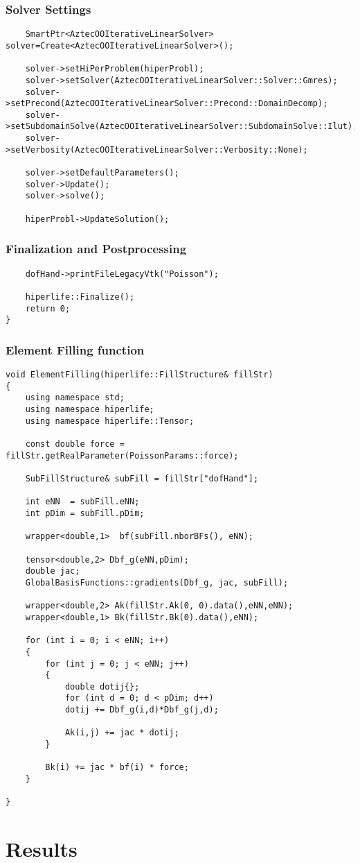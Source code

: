 \documentclass[]{article}
\begin{document}
\subsubsection{Solver Settings} \label{sec: slv}
\begin{lstlisting}
	SmartPtr<AztecOOIterativeLinearSolver> solver=Create<AztecOOIterativeLinearSolver>();
	
	solver->setHiPerProblem(hiperProbl);
	solver->setSolver(AztecOOIterativeLinearSolver::Solver::Gmres);
	solver->setPrecond(AztecOOIterativeLinearSolver::Precond::DomainDecomp);
	solver->setSubdomainSolve(AztecOOIterativeLinearSolver::SubdomainSolve::Ilut);
	solver->setVerbosity(AztecOOIterativeLinearSolver::Verbosity::None);
	
	solver->setDefaultParameters();
	solver->Update();
	solver->solve();
	
	hiperProbl->UpdateSolution();
\end{lstlisting}

\subsubsection{Finalization and Postprocessing} \label{sec: fnl}
\begin{lstlisting}
	dofHand->printFileLegacyVtk("Poisson");
		
	hiperlife::Finalize();
	return 0;
}
\end{lstlisting}

\subsubsection{Element Filling function} \label{sec: elff}
\begin{lstlisting}	
void ElementFilling(hiperlife::FillStructure& fillStr)
{
	using namespace std;
	using namespace hiperlife;
	using namespace hiperlife::Tensor;

	const double force = fillStr.getRealParameter(PoissonParams::force);
		
	SubFillStructure& subFill = fillStr["dofHand"];

	int eNN  = subFill.eNN;
	int pDim = subFill.pDim;
		
	wrapper<double,1>  bf(subFill.nborBFs(), eNN);
		
	tensor<double,2> Dbf_g(eNN,pDim);
	double jac;
	GlobalBasisFunctions::gradients(Dbf_g, jac, subFill);
		
	wrapper<double,2> Ak(fillStr.Ak(0, 0).data(),eNN,eNN);
	wrapper<double,1> Bk(fillStr.Bk(0).data(),eNN);
		
	for (int i = 0; i < eNN; i++)
	{
		for (int j = 0; j < eNN; j++)
		{
			double dotij{};
			for (int d = 0; d < pDim; d++)
			dotij += Dbf_g(i,d)*Dbf_g(j,d);
				
			Ak(i,j) += jac * dotij;
		}
			
		Bk(i) += jac * bf(i) * force;
	}
		
}
\end{lstlisting}
\section{Results} \label{sec: rst}
\end{document}
